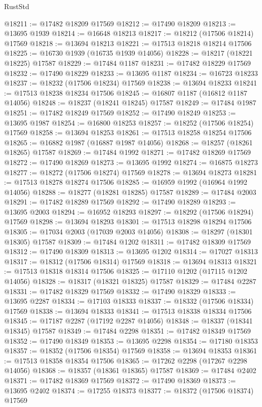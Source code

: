 \begin{lexlean}{RustStd}
\begin{coremodule}
@18211 := @17482 @18209 @17569
@18212 := @17490 @18209
@18213 := @13695 @1939
@18214 := @16648 @18213
@18217 := @18212 (@17506 @18214) @17569
@18218 := @13694 @18213
@18221 := @17513 @18218 @18214 @17506
@18225 := @16730 @1939 (@16735 @1939 @14056)
@18228 := @18217 (@18221 @18225) @17587
@18229 := @17484 @1187
@18231 := @17482 @18229 @17569
@18232 := @17490 @18229
@18233 := @13695 @1187
@18234 := @16723 @18233
@18237 := @18232 (@17506 @18234) @17569
@18238 := @13694 @18233
@18241 := @17513 @18238 @18234 @17506
@18245 := @16807 @1187 (@16812 @1187 @14056)
@18248 := @18237 (@18241 @18245) @17587
@18249 := @17484 @1987
@18251 := @17482 @18249 @17569
@18252 := @17490 @18249
@18253 := @13695 @1987
@18254 := @16800 @18253
@18257 := @18252 (@17506 @18254) @17569
@18258 := @13694 @18253
@18261 := @17513 @18258 @18254 @17506
@18265 := @16882 @1987 (@16887 @1987 @14056)
@18268 := @18257 (@18261 @18265) @17587
@18269 := @17484 @1992
@18271 := @17482 @18269 @17569
@18272 := @17490 @18269
@18273 := @13695 @1992
@18274 := @16875 @18273
@18277 := @18272 (@17506 @18274) @17569
@18278 := @13694 @18273
@18281 := @17513 @18278 @18274 @17506
@18285 := @16959 @1992 (@16964 @1992 @14056)
@18288 := @18277 (@18281 @18285) @17587
@18289 := @17484 @2003
@18291 := @17482 @18289 @17569
@18292 := @17490 @18289
@18293 := @13695 @2003
@18294 := @16952 @18293
@18297 := @18292 (@17506 @18294) @17569
@18298 := @13694 @18293
@18301 := @17513 @18298 @18294 @17506
@18305 := @17034 @2003 (@17039 @2003 @14056)
@18308 := @18297 (@18301 @18305) @17587
@18309 := @17484 @1202
@18311 := @17482 @18309 @17569
@18312 := @17490 @18309
@18313 := @13695 @1202
@18314 := @17027 @18313
@18317 := @18312 (@17506 @18314) @17569
@18318 := @13694 @18313
@18321 := @17513 @18318 @18314 @17506
@18325 := @17110 @1202 (@17115 @1202 @14056)
@18328 := @18317 (@18321 @18325) @17587
@18329 := @17484 @2287
@18331 := @17482 @18329 @17569
@18332 := @17490 @18329
@18333 := @13695 @2287
@18334 := @17103 @18333
@18337 := @18332 (@17506 @18334) @17569
@18338 := @13694 @18333
@18341 := @17513 @18338 @18334 @17506
@18345 := @17187 @2287 (@17192 @2287 @14056)
@18348 := @18337 (@18341 @18345) @17587
@18349 := @17484 @2298
@18351 := @17482 @18349 @17569
@18352 := @17490 @18349
@18353 := @13695 @2298
@18354 := @17180 @18353
@18357 := @18352 (@17506 @18354) @17569
@18358 := @13694 @18353
@18361 := @17513 @18358 @18354 @17506
@18365 := @17262 @2298 (@17267 @2298 @14056)
@18368 := @18357 (@18361 @18365) @17587
@18369 := @17484 @2402
@18371 := @17482 @18369 @17569
@18372 := @17490 @18369
@18373 := @13695 @2402
@18374 := @17255 @18373
@18377 := @18372 (@17506 @18374) @17569

\end{coremodule}
\end{lexlean}
